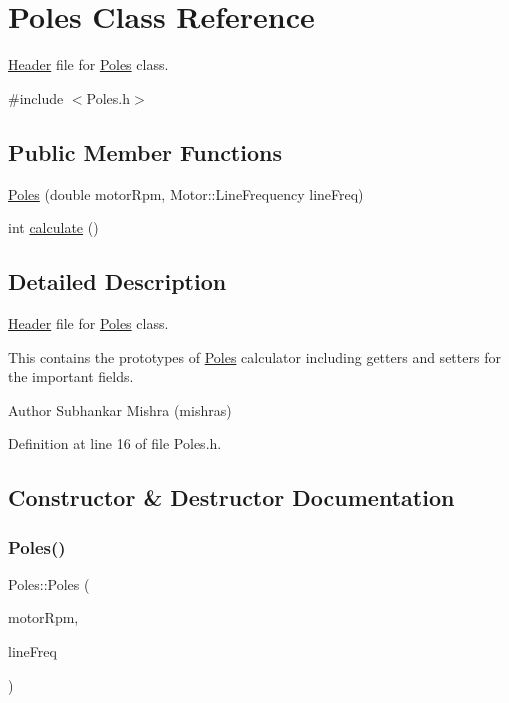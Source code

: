 \hypertarget{class_poles}{}\section{Poles Class Reference}
\label{class_poles}


\hyperlink{class_header}{Header} file for \hyperlink{class_poles}{Poles} class.  




{\ttfamily \#include $<$Poles.\+h$>$}

\subsection*{Public Member Functions}
\begin{DoxyCompactItemize}
\item 
\hyperlink{class_poles_aade5d01dab7a461e582449e5bb17f6d6}{Poles} (double motor\+Rpm, Motor\+::\+Line\+Frequency line\+Freq)
\item 
int \hyperlink{class_poles_a23988f68100374c8277dca81ab06f724}{calculate} ()
\end{DoxyCompactItemize}


\subsection{Detailed Description}
\hyperlink{class_header}{Header} file for \hyperlink{class_poles}{Poles} class. 

This contains the prototypes of \hyperlink{class_poles}{Poles} calculator including getters and setters for the important fields.

\begin{DoxyAuthor}{Author}
Subhankar Mishra (mishras) 
\end{DoxyAuthor}


Definition at line 16 of file Poles.\+h.



\subsection{Constructor \& Destructor Documentation}
\mbox{\label{class_poles_aade5d01dab7a461e582449e5bb17f6d6}} 
\subsubsection{\texorpdfstring{Poles()}{Poles()}}
{\footnotesize\ttfamily Poles\+::\+Poles (\begin{DoxyParamCaption}\item[{double}]{motor\+Rpm,  }\item[{Motor\+::\+Line\+Frequency}]{line\+Freq }\end{DoxyParamCaption})\hspace{0.3cm}{\ttfamily [inline]}}

